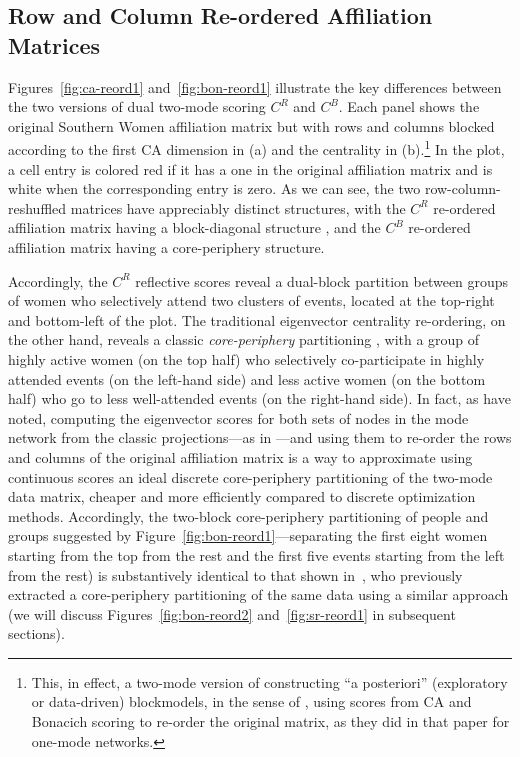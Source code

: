 \documentclass[a4paper,fleqn]{cas-sc}
\begin{document}
\subsection{Row and Column Re-ordered Affiliation Matrices} 
Figures~\ref{fig:ca-reord1} and~\ref{fig:bon-reord1} illustrate the key differences between the two versions of dual two-mode scoring $C^R$ and $C^B$. Each panel shows the original Southern Women affiliation matrix but with rows and columns blocked according to the first CA dimension in (a) and the \citet{bonacich1991simultaneous} centrality in (b).\footnote{This, in effect, a two-mode version of constructing ``a posteriori'' (exploratory or data-driven) blockmodels, in the sense of \citet{wasserman1987stochastic}, using scores from CA and Bonacich scoring to re-order the original matrix, as they did in that paper for one-mode networks.} In the plot, a cell entry is colored red if it has a one in the original affiliation matrix and is white when the corresponding entry is zero. As we can see, the two row-column-reshuffled matrices have appreciably distinct structures, with the $C^R$ re-ordered affiliation matrix having a block-diagonal structure \citep[34]{wasserman1990correspondence}, and the $C^B$ re-ordered affiliation matrix having a core-periphery structure. 

Accordingly, the $C^R$ reflective scores reveal a dual-block partition between groups of women who selectively attend two clusters of events, located at the top-right and bottom-left of the plot. The traditional eigenvector centrality re-ordering, on the other hand, reveals a classic \textit{core-periphery} partitioning \citep{borgatti2000models}, with a group of highly active women (on the top half) who selectively co-participate in highly attended events (on the left-hand side) and less active women (on the bottom half) who go to less well-attended events (on the right-hand side). In fact, as \citet[p. 206]{everett2013dual} have noted, computing the eigenvector scores for both sets of nodes in the mode network from the classic \citet{breiger1974duality} projections---as in \citet{bonacich1991simultaneous}---and using them to re-order the rows and columns of the original affiliation matrix is a way to approximate using continuous scores an ideal discrete core-periphery partitioning of the two-mode data matrix, cheaper and more efficiently compared to discrete optimization methods. Accordingly, the two-block core-periphery partitioning of people and groups suggested by Figure~\ref{fig:bon-reord1}---separating the first eight women starting from the top from the rest and the first five events starting from the left from the rest) is substantively identical to that shown in~\citet[206, Table 2]{everett2013dual}, who previously extracted a core-periphery partitioning of the same data using a similar approach (we will discuss Figures~\ref{fig:bon-reord2} and~\ref{fig:sr-reord1} in subsequent sections).
\end{document}
